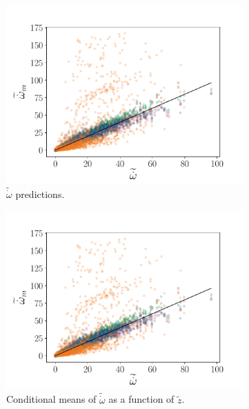 \documentclass[review]{elsarticle}
\newcommand{\wt}[1]{\widetilde{#1}}
\begin{document}
\begin{figure}[!tbp]%
  \centering%
  \begin{subfigure}[t]{0.32\textwidth}%
    \includegraphics[page=1,width=\textwidth, trim=0.5cm 0cm 1.3cm 1.3cm, clip=true]{./figs/convolution_skip.pdf}%
    \caption{$\wt{\dot{\omega}}$ predictions.}%
  \end{subfigure}\hfill%
  \begin{subfigure}[t]{0.32\textwidth}%
    \includegraphics[page=3,width=\textwidth, trim=0.5cm 0cm 1.5cm 1.3cm, clip=true]{./figs/convolution_skip.pdf}%
    \caption{Conditional means of $\wt{\dot{\omega}}$ as a function of $\wt{z}$.}%
  \end{subfigure}\hfill%
  \begin{subfigure}[t]{0.32\textwidth}%

\end{subfigure}
\end{figure}
\end{document}
